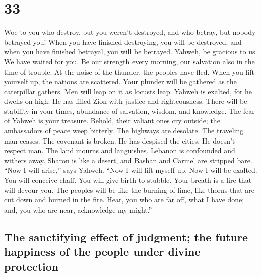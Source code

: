 \hypertarget{section-32}{%
\section{33}\label{section-32}}

 Woe to you who destroy, but you weren't destroyed, and
who betray, but nobody betrayed you! When you have finished destroying,
you will be destroyed; and when you have finished betrayal, you will be
betrayed.  Yahweh, be gracious to us. We have waited for
you. Be our strength every morning, our salvation also in the time of
trouble.  At the noise of the thunder, the peoples have
fled. When you lift yourself up, the nations are scattered.
 Your plunder will be gathered as the caterpillar gathers.
Men will leap on it as locusts leap.  Yahweh is exalted,
for he dwells on high. He has filled Zion with justice and
righteousness.  There will be stability in your times,
abundance of salvation, wisdom, and knowledge. The fear of Yahweh is
your treasure.  Behold, their valiant ones cry outside;
the ambassadors of peace weep bitterly.  The highways are
desolate. The traveling man ceases. The covenant is broken. He has
despised the cities. He doesn't respect man.  The land
mourns and languishes. Lebanon is confounded and withers away. Sharon is
like a desert, and Bashan and Carmel are stripped bare. 
``Now I will arise,'' says Yahweh. ``Now I will lift myself up. Now I
will be exalted.  You will conceive chaff. You will give
birth to stubble. Your breath is a fire that will devour you.
 The peoples will be like the burning of lime, like
thorns that are cut down and burned in the fire.  Hear,
you who are far off, what I have done; and, you who are near,
acknowledge my might.''

\hypertarget{the-sanctifying-effect-of-judgment-the-future-happiness-of-the-people-under-divine-protection}{%
\subsection{The sanctifying effect of judgment; the future happiness of
the people under divine
protection}\label{the-sanctifying-effect-of-judgment-the-future-happiness-of-the-people-under-divine-protection}}

